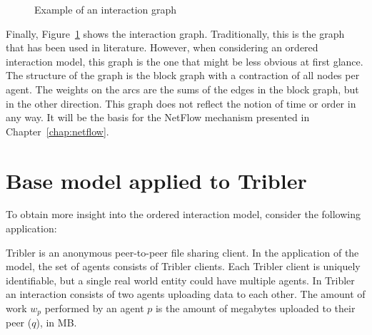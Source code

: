 \documentclass[a4paper,11pt]{book}
\theoremstyle{definition}
\begin{document}
\begin{figure}[h]
    \centering
     \caption{Example of an interaction graph}
     \label{fig:ex_ig}
\end{figure}

Finally, Figure~\ref{fig:ex_ig} shows the interaction graph. Traditionally, this is the graph
that has been used in literature. However, when considering an ordered interaction model, this
graph is the one that might be less obvious at first glance. The structure of the graph
is the block graph with a contraction of all nodes per agent. The weights on the arcs are
the sums of the edges in the block graph, but in the other direction. This graph does
not reflect the notion of time or order in any way. It will be the basis for the
NetFlow mechanism presented in Chapter~\ref{chap:netflow}.



\section{Base model applied to Tribler}

To obtain more insight into the ordered interaction model, consider the following application:

Tribler is an anonymous peer-to-peer file sharing client. In the application of the model,
the set of agents consists of Tribler clients. Each Tribler client is uniquely identifiable,
but a single real world entity could have multiple agents. In Tribler an interaction
consists of two agents uploading data to each other. The amount of work $w_p$ performed
by an agent $p$ is the amount of megabytes uploaded to their peer ($q$), in MB.
\end{document}
